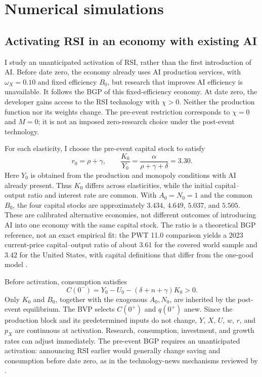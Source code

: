\section{Numerical simulations}
\label{sec:rewrite-quantitative}


\subsection{Activating RSI in an economy with existing AI}
\label{subsec:rewrite-rsi-activation}

I study an unanticipated activation of RSI, rather than the first introduction
of AI. Before date zero, the economy already uses AI production services,
with $\omega_X=0.10$ and fixed efficiency $B_0$, but research that improves
AI efficiency is unavailable. It follows the BGP of this fixed-efficiency
economy. At date zero, the developer gains access to the RSI technology
with $\chi>0$. Neither the production function nor its weights change.
The pre-event restriction corresponds to $\chi=0$ and $M=0$; it is not an
imposed zero-research choice under the post-event technology.

For each elasticity, I choose the pre-event capital stock to satisfy
\begin{equation}
 r_0=\rho+\gamma,\qquad
 \frac{K_0}{Y_0}=\frac{\alpha}{\rho+\gamma+\delta}=3.30.
 \label{eq:rewrite-rsi-initial-ratio}
\end{equation}
Here $Y_0$ is obtained from the production and monopoly conditions with AI
already present. Thus $K_0$ differs across elasticities, while the initial
capital--output ratio and interest rate are common. With $A_0=N_0=1$ and
the common $B_0$, the four capital stocks are approximately $3.434$, $4.649$,
$5.037$, and $5.505$. These are calibrated alternative economies, not
different outcomes of introducing AI into one economy with the same capital
stock. The ratio is a theoretical BGP reference, not an exact empirical fit:
the PWT 11.0 comparison yields a 2023 current-price capital--output ratio
of about $3.61$ for the covered world sample and $3.42$ for the United States,
with capital definitions that differ from the one-good model \citep{pwt110}.

Before activation, consumption satisfies
\begin{equation}
 C(0^-)=Y_0-U_0-(\delta+n+\gamma)K_0>0.
 \label{eq:rewrite-rsi-pre-consumption}
\end{equation}
Only $K_0$ and $B_0$, together with the exogenous $A_0,N_0$, are inherited
by the post-event equilibrium. The BVP selects $C(0^+)$ and $q(0^+)$ anew.
Since the production block and its predetermined inputs do not change,
$Y$, $X$, $U$, $w$, $r$, and $p_X$ are continuous at activation. Research,
consumption, investment, and growth rates can adjust immediately. The
pre-event BGP requires an unanticipated activation: announcing RSI earlier
would generally change saving and consumption before date zero, as in the
technology-news mechanisms reviewed by \citet{beaudryportier2014}.

